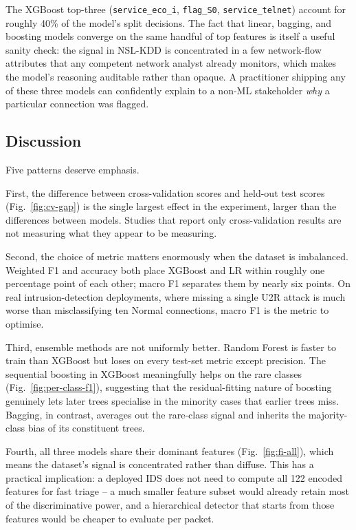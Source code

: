 \documentclass[conference, twocolumn]{IEEEtran}
\begin{document}
The XGBoost top-three (\texttt{service\_eco\_i}, \texttt{flag\_S0}, \texttt{service\_telnet}) account for roughly 40\% of the model's split decisions. The fact that linear, bagging, and boosting models converge on the same handful of top features is itself a useful sanity check: the signal in NSL-KDD is concentrated in a few network-flow attributes that any competent network analyst already monitors, which makes the model's reasoning auditable rather than opaque. A practitioner shipping any of these three models can confidently explain to a non-ML stakeholder \emph{why} a particular connection was flagged.

\subsection{Discussion}

Five patterns deserve emphasis.

First, the difference between cross-validation scores and held-out test scores (Fig.~\ref{fig:cv-gap}) is the single largest effect in the experiment, larger than the differences between models. Studies that report only cross-validation results are not measuring what they appear to be measuring.

Second, the choice of metric matters enormously when the dataset is imbalanced. Weighted F1 and accuracy both place XGBoost and LR within roughly one percentage point of each other; macro F1 separates them by nearly six points. On real intrusion-detection deployments, where missing a single U2R attack is much worse than misclassifying ten Normal connections, macro F1 is the metric to optimise.

Third, ensemble methods are not uniformly better. Random Forest is faster to train than XGBoost but loses on every test-set metric except precision. The sequential boosting in XGBoost meaningfully helps on the rare classes (Fig.~\ref{fig:per-class-f1}), suggesting that the residual-fitting nature of boosting genuinely lets later trees specialise in the minority cases that earlier trees miss. Bagging, in contrast, averages out the rare-class signal and inherits the majority-class bias of its constituent trees.

Fourth, all three models share their dominant features (Fig.~\ref{fig:fi-all}), which means the dataset's signal is concentrated rather than diffuse. This has a practical implication: a deployed IDS does not need to compute all 122 encoded features for fast triage -- a much smaller feature subset would already retain most of the discriminative power, and a hierarchical detector that starts from those features would be cheaper to evaluate per packet.
\end{document}
